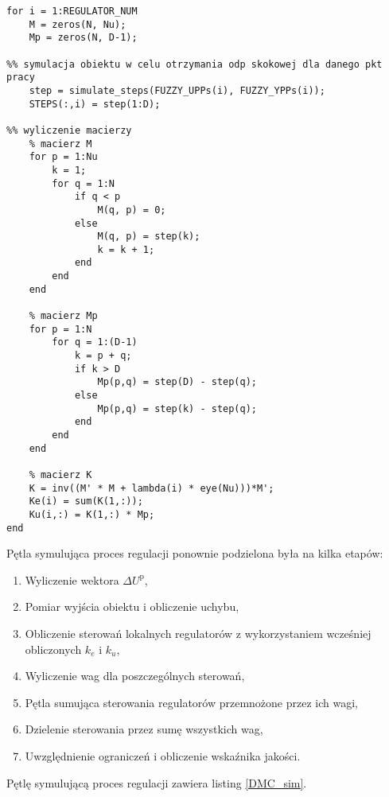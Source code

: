 \begin{lstlisting}[style=custommatlab,frame=single,label={DMC_matrices},caption={Wyliczenie macierzy algorytmu DMC dla regulatorów lokalnych},captionpos=b]
for i = 1:REGULATOR_NUM
    M = zeros(N, Nu);
    Mp = zeros(N, D-1);

%% symulacja obiektu w celu otrzymania odp skokowej dla danego pkt pracy    
    step = simulate_steps(FUZZY_UPPs(i), FUZZY_YPPs(i));
    STEPS(:,i) = step(1:D);
    
%% wyliczenie macierzy 
    % macierz M
    for p = 1:Nu
        k = 1;
        for q = 1:N
            if q < p
                M(q, p) = 0;
            else
                M(q, p) = step(k);
                k = k + 1;
            end
        end
    end

    % macierz Mp
    for p = 1:N
        for q = 1:(D-1)
            k = p + q;
            if k > D
                Mp(p,q) = step(D) - step(q);
            else
                Mp(p,q) = step(k) - step(q);
            end
        end
    end

    % macierz K
    K = inv((M' * M + lambda(i) * eye(Nu)))*M';
    Ke(i) = sum(K(1,:));
    Ku(i,:) = K(1,:) * Mp;
end    
\end{lstlisting}

Pętla symulująca proces regulacji ponownie podzielona była na kilka etapów:

\begin{enumerate}
\item Wyliczenie wektora $\Delta U^{\mathrm{p}}$,
\item Pomiar wyjścia obiektu i obliczenie uchybu,
\item Obliczenie sterowań lokalnych regulatorów z wykorzystaniem wcześniej obliczonych $k_{e}$ i $k_{u}$,
\item Wyliczenie wag dla poszczególnych sterowań,
\item Pętla sumująca sterowania regulatorów przemnożone przez ich wagi,
\item Dzielenie sterowania przez sumę wszystkich wag,
\item Uwzględnienie ograniczeń i obliczenie wskaźnika jakości.
\end{enumerate}

Pętlę symulującą proces regulacji zawiera listing \ref{DMC_sim}.

